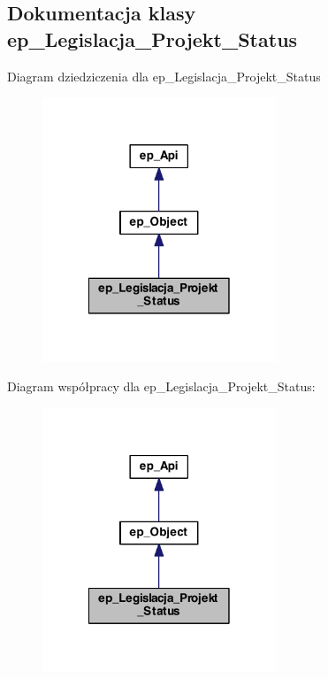 \hypertarget{classep___legislacja___projekt___status}{\subsection{Dokumentacja klasy ep\-\_\-\-Legislacja\-\_\-\-Projekt\-\_\-\-Status}
\label{classep___legislacja___projekt___status}
}


Diagram dziedziczenia dla ep\-\_\-\-Legislacja\-\_\-\-Projekt\-\_\-\-Status\nopagebreak
\begin{figure}[H]
\begin{center}
\leavevmode
\includegraphics[width=198pt]{classep___legislacja___projekt___status__inherit__graph}
\end{center}
\end{figure}


Diagram współpracy dla ep\-\_\-\-Legislacja\-\_\-\-Projekt\-\_\-\-Status\-:\nopagebreak
\begin{figure}[H]
\begin{center}
\leavevmode
\includegraphics[width=198pt]{classep___legislacja___projekt___status__coll__graph}
\end{center}
\end{figure}
